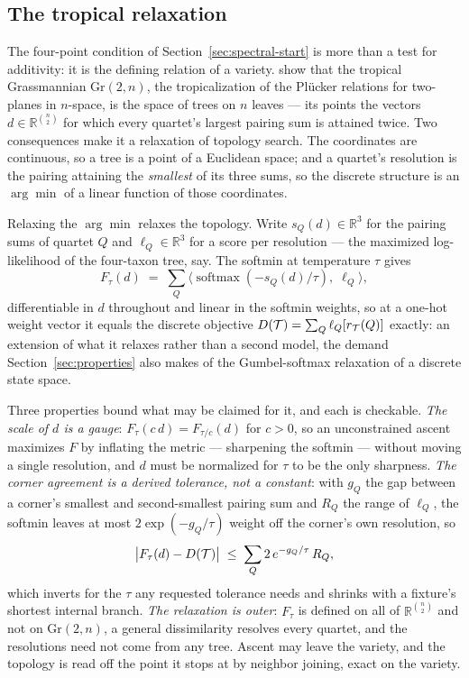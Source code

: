 \documentclass[11pt,a4paper]{article}
\begin{document}
\subsection{The tropical relaxation}
\label{sec:tropical}
The four-point condition of Section~\ref{sec:spectral-start} is more than a
test for additivity: it is the defining relation of a variety.
\citet{speyer2004} show that the tropical Grassmannian $\mathrm{Gr}(2,n)$, the
tropicalization of the Pl\"ucker relations for two-planes in $n$-space, is the
space of trees on $n$ leaves --- its points the vectors
$d \in \mathbb{R}^{\binom{n}{2}}$ for which every quartet's largest pairing sum
is attained twice. Two consequences make it a relaxation of topology search.
The coordinates are continuous, so a tree is a point of a Euclidean space; and
a quartet's resolution is the pairing attaining the \emph{smallest} of its
three sums, so the discrete structure is an $\arg\min$ of a linear function of
those coordinates.

Relaxing the $\arg\min$ relaxes the topology. Write $s_Q(d) \in \mathbb{R}^3$
for the pairing sums of quartet $Q$ and $\ell_Q \in \mathbb{R}^3$ for a score
per resolution --- the maximized log-likelihood of the four-taxon tree, say.
The softmin at temperature $\tau$ gives
\begin{equation}
  F_\tau(d) \;=\; \sum_Q \big\langle
    \operatorname{softmax}(-s_Q(d)/\tau),\; \ell_Q \big\rangle,
  \label{eq:tropical-relaxation}
\end{equation}
differentiable in $d$ throughout and linear in the softmin weights, so at a
one-hot weight vector it equals the discrete objective
$D(\mathcal{T}) = \sum_Q \ell_Q[r_{\mathcal{T}}(Q)]$ exactly: an extension of what it relaxes
rather than a second model, the demand Section~\ref{sec:properties} also makes
of the Gumbel-softmax relaxation of a discrete state space.

Three properties bound what may be claimed for it, and each is checkable.
\emph{The scale of $d$ is a gauge}: $F_\tau(c\,d) = F_{\tau/c}(d)$ for
$c > 0$, so an unconstrained ascent maximizes $F$ by inflating the metric ---
sharpening the softmin --- without moving a single resolution, and $d$ must be
normalized for $\tau$ to be the only sharpness. \emph{The corner agreement is
a derived tolerance, not a constant}: with $g_Q$ the gap between a corner's
smallest and second-smallest pairing sum and $R_Q$ the range of $\ell_Q$, the
softmin leaves at most $2\exp(-g_Q/\tau)$ weight off the corner's own
resolution, so
\begin{equation}
  \big| F_\tau(d) - D(\mathcal{T}) \big| \;\le\; \sum_Q 2\,e^{-g_Q/\tau}\,R_Q,
  \label{eq:tropical-corner}
\end{equation}
which inverts for the $\tau$ any requested tolerance needs and shrinks with a
fixture's shortest internal branch. \emph{The relaxation is outer}: $F_\tau$ is
defined on all of $\mathbb{R}^{\binom{n}{2}}$ and not on $\mathrm{Gr}(2,n)$, a
general dissimilarity resolves every quartet, and the resolutions need not come
from any tree. Ascent may leave the variety, and the topology is read off the
point it stops at by neighbor joining, exact on the variety.
\end{document}
